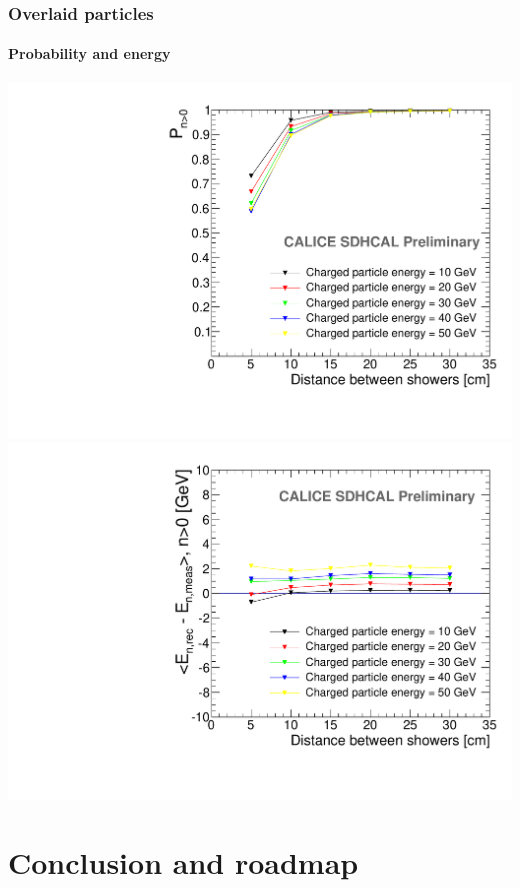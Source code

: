 \documentclass[8pt]{beamer}
\begin{document}
  \begin{frame}
  \frametitle{Overlaid particles}
  \framesubtitle{Probability and energy}
    \begin{center}
      \includegraphics[width=0.48\linewidth]{OverlayEvent_NeutralPercentage.pdf}
      \includegraphics[width=0.48\linewidth]{OverlayEvent_NeutralEnergyDifferenceMeanNeutralEfficient.pdf}
    \end{center}
  \end{frame}
  
      
  \section{Conclusion and roadmap}
  
\end{document}
